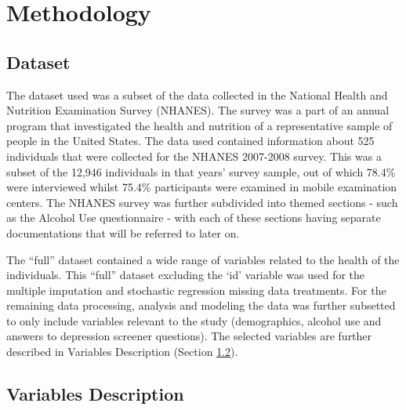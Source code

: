 \documentclass[
]{article}
\begin{document}
\hypertarget{methodology}{%
\section{Methodology}\label{methodology}}

\hypertarget{dataset}{%
\subsection{Dataset}\label{dataset}}

The dataset used was a subset of the data collected in the National Health and Nutrition Examination Survey (NHANES). The survey was a part of an annual program that investigated the health and nutrition of a representative sample of people in the United States. The data used contained information about 525 individuals that were collected for the NHANES 2007-2008 survey. This was a subset of the 12,946 individuals in that years' survey sample, out of which 78.4\% were interviewed whilst 75.4\% participants were examined in mobile examination centers. The NHANES survey was further subdivided into themed sections - such as the Alcohol Use questionnaire - with each of these sections having separate documentations that will be referred to later on.

The ``full'' dataset contained a wide range of variables related to the health of the individuals. This ``full'' dataset excluding the `id' variable was used for the multiple imputation and stochastic regression missing data treatments. For the remaining data processing, analysis and modeling the data was further subsetted to only include variables relevant to the study (demographics, alcohol use and answers to depression screener questions). The selected variables are further described in Variables Description (Section \ref{var-desc}).

\hypertarget{var-desc}{%
\subsection{Variables Description}\label{var-desc}}
\end{document}
